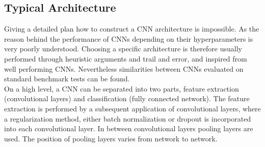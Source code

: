 \subsection{Typical Architecture}
Giving a detailed plan how to construct a CNN architecture is impossible. As the reason behind the performance of CNNs depending on their hyperparameters is very poorly understood. Choosing a specific architecture is therefore usually performed through heuristic arguments and trail and error, and inspired from well performing CNNs. Nevertheless similarities between CNNs evaluated on standard benchmark tests can be found. \\

On a high level, a CNN can be separated into two parts, feature extraction (convolutional layers) and classification (fully connected network). The feature extraction is performed by a subsequent application of convolutional layers, where a regularization method, either batch normalization or dropout is incorporated into each convolutional layer. In between convolutional layers pooling layers are used. The position of pooling layers varies from network to network.
%
%
%
%
%


